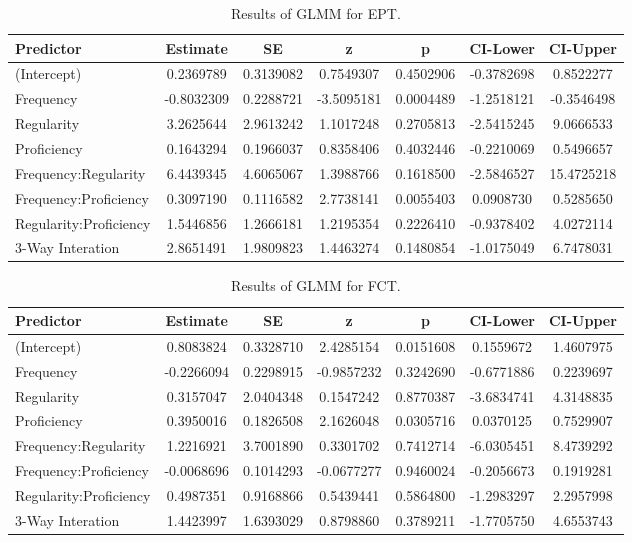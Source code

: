 \documentclass[
  english,
  man]{apa6}
\begin{document}
\begin{appendix}
\begin{table}
\caption{\label{tab:create-EPT-table-appendix}Results of GLMM for EPT.}
\centering
\begin{tabular}[t]{l|c|c|c|c|c|c}
\hline
Predictor & Estimate & SE & z & p & CI-Lower & CI-Upper\\
\hline
(Intercept) & 0.2369789 & 0.3139082 & 0.7549307 & 0.4502906 & -0.3782698 & 0.8522277\\
\hline
Frequency & -0.8032309 & 0.2288721 & -3.5095181 & 0.0004489 & -1.2518121 & -0.3546498\\
\hline
Regularity & 3.2625644 & 2.9613242 & 1.1017248 & 0.2705813 & -2.5415245 & 9.0666533\\
\hline
Proficiency & 0.1643294 & 0.1966037 & 0.8358406 & 0.4032446 & -0.2210069 & 0.5496657\\
\hline
Frequency:Regularity & 6.4439345 & 4.6065067 & 1.3988766 & 0.1618500 & -2.5846527 & 15.4725218\\
\hline
Frequency:Proficiency & 0.3097190 & 0.1116582 & 2.7738141 & 0.0055403 & 0.0908730 & 0.5285650\\
\hline
Regularity:Proficiency & 1.5446856 & 1.2666181 & 1.2195354 & 0.2226410 & -0.9378402 & 4.0272114\\
\hline
3-Way Interation & 2.8651491 & 1.9809823 & 1.4463274 & 0.1480854 & -1.0175049 & 6.7478031\\
\hline
\end{tabular}
\end{table}

\begin{table}

\caption{\label{tab:create-FCT-table-appendix}Results of GLMM for FCT.}
\centering
\begin{tabular}[t]{l|c|c|c|c|c|c}
\hline
Predictor & Estimate & SE & z & p & CI-Lower & CI-Upper\\
\hline
(Intercept) & 0.8083824 & 0.3328710 & 2.4285154 & 0.0151608 & 0.1559672 & 1.4607975\\
\hline
Frequency & -0.2266094 & 0.2298915 & -0.9857232 & 0.3242690 & -0.6771886 & 0.2239697\\
\hline
Regularity & 0.3157047 & 2.0404348 & 0.1547242 & 0.8770387 & -3.6834741 & 4.3148835\\
\hline
Proficiency & 0.3950016 & 0.1826508 & 2.1626048 & 0.0305716 & 0.0370125 & 0.7529907\\
\hline
Frequency:Regularity & 1.2216921 & 3.7001890 & 0.3301702 & 0.7412714 & -6.0305451 & 8.4739292\\
\hline
Frequency:Proficiency & -0.0068696 & 0.1014293 & -0.0677277 & 0.9460024 & -0.2056673 & 0.1919281\\
\hline
Regularity:Proficiency & 0.4987351 & 0.9168866 & 0.5439441 & 0.5864800 & -1.2983297 & 2.2957998\\
\hline
3-Way Interation & 1.4423997 & 1.6393029 & 0.8798860 & 0.3789211 & -1.7705750 & 4.6553743\\
\hline
\end{tabular}
\end{table}
\end{appendix}
\end{document}
